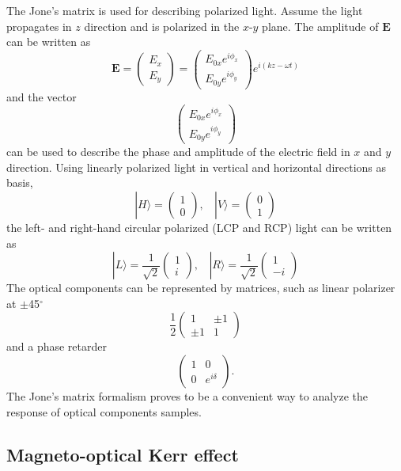 \documentclass[pdflatex, sectionletters, 12pt, final, phd]{pittetd}    %
\begin{document}
The Jone's matrix is used for describing polarized light. Assume the light propagates in $z$ direction and is polarized in the $x$-$y$ plane. The amplitude of $\mathbf{E}$ can be written as
$$
\mathbf{E} = 
\begin{pmatrix}
E_x \\
E_y
\end{pmatrix}
=
\begin{pmatrix}
E_{0x} e^{i\phi_x} \\
E_{0y} e^{i\phi_y}
\end{pmatrix}
e^{i(kz - \omega t)}
$$
and the vector 
$$
\begin{pmatrix}
E_{0x} e^{i\phi_x} \\
E_{0y} e^{i\phi_y}
\end{pmatrix}
$$
can be used to describe the phase and amplitude of the electric field in $x$ and $y$ direction. Using linearly polarized light in vertical and horizontal directions as basis, 
$$
|H \rangle = 
\begin{pmatrix}
1 \\
0
\end{pmatrix}, \ \ \ \
|V \rangle = 
\begin{pmatrix}
0 \\
1
\end{pmatrix}
$$
the left- and right-hand circular polarized (LCP and RCP) light can be written as
$$
|L \rangle = \frac{1}{\sqrt{2}}
\begin{pmatrix}
1 \\
i
\end{pmatrix}, \ \ \ \
|R \rangle = \frac{1}{\sqrt{2}}
\begin{pmatrix}
1 \\
-i
\end{pmatrix}
$$
The optical components can be represented by matrices, such as linear polarizer at $\pm$45$^{\circ}$
$$
\frac{1}{2}
\begin{pmatrix}
1 & \pm 1 \\
\pm 1 & 1
\end{pmatrix}
$$
and a phase retarder
$$
\begin{pmatrix}
1 & 0 \\
0 & e^{i\delta}
\end{pmatrix}.
$$
The Jone's matrix formalism proves to be a convenient way to analyze the response of optical components samples.

\subsection{Magneto-optical Kerr effect}
\end{document}
